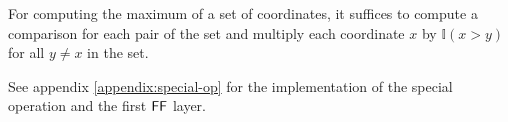 For computing the maximum of a set of coordinates, it suffices to compute a comparison for each pair of the set and multiply each coordinate $x$ by $\mathbb{I}(x > y)$ for all $y \neq x$ in the set.

See appendix \ref{appendix:special-op} for the implementation of the special operation and the first $\mathsf{FF}$ layer.